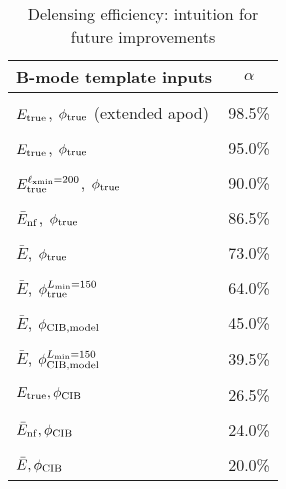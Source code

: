 \begin{table}
\caption{Delensing efficiency: intuition for future improvements}
\centering
\begin{tabular}{|l | c |}
\hline
B-mode template inputs &  $\alpha$ \\
\hline
\vspace{-0.25cm}& \\
$E_{\rm true}$, $\phi_{\rm true}$ (extended apod)   &  98.5\% \\
\vspace{-0.25cm}&   \\
$E_{\rm true}$, $\phi_{\rm true}$                       & 95.0\%\\
\vspace{-0.25cm}&   \\
$E_{\rm true}^{\ell_{\rm xmin}=200}$, $\phi_{\rm true}$ & 90.0\%  \\
\vspace{-0.25cm}&   \\
$\bar{E}_{\rm nf}$, $\phi_{\rm true}$ 			& 86.5\% \\
\vspace{-0.25cm}&   \\
$\bar{E}$, $\phi_{\rm true}$ 				& 73.0\% \\
\vspace{-0.25cm}&   \\
$\bar{E}$, $\phi_{\rm true}^{L_{\rm min}=150}$ 		& 64.0\% \\
\vspace{-0.25cm}&   \\
$\bar{E}$, $\phi_{\rm CIB, model} $ 				& 45.0\% \\
\vspace{-0.25cm}&   \\
$\bar{E}$, $\phi_{\rm CIB, model}^{L_{\rm min} =150} $ 	& 39.5\% \\
\vspace{-0.25cm}&   \\
$E_{\rm true}, \phi_{\rm CIB}$                          & 26.5\% \\
\vspace{-0.25cm}&   \\
$\bar{E}_{\rm nf}, \phi_{\rm CIB}$                      & 24.0\% \\
\vspace{-0.25cm}&   \\
$\bar{E}, \phi_{\rm CIB}$                               & 20.0\% \\
\hline
\end{tabular}

\end{table}
